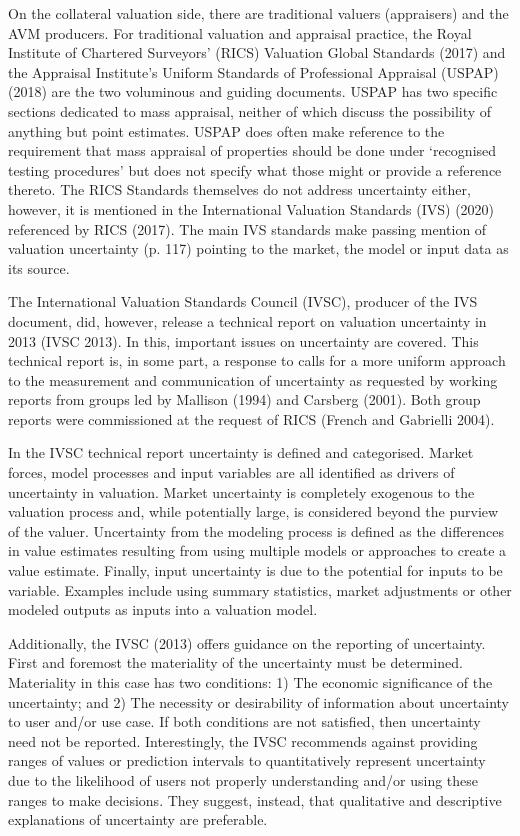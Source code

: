 \documentclass[colTwo]{anon}
\theoremstyle{definition}
\begin{document}
On the collateral valuation side, there are traditional valuers (appraisers) and the AVM producers. For traditional valuation and appraisal practice, the Royal Institute of Chartered Surveyors’ (RICS) Valuation Global Standards (2017) and the Appraisal Institute’s Uniform Standards of Professional Appraisal (USPAP) (2018) are the two voluminous and guiding documents. USPAP has two specific sections dedicated to mass appraisal, neither of which discuss the possibility of anything but point estimates. USPAP does often make reference to the requirement that mass appraisal of properties should be done under ‘recognised testing procedures’ but does not specify what those might or provide a reference thereto. The RICS Standards themselves do not address uncertainty either, however, it is mentioned in the International Valuation Standards (IVS) (2020) referenced by RICS (2017).  The main IVS standards make passing mention of valuation uncertainty (p. 117) pointing to the market, the model or input data as its source.  

The International Valuation Standards Council (IVSC), producer of the IVS document, did, however, release a technical report on valuation uncertainty in 2013 (IVSC 2013). In this, important issues on uncertainty are covered. This technical report is, in some part, a response to calls for a more uniform approach to the measurement and communication of uncertainty as requested by working reports from groups led by Mallison (1994) and Carsberg (2001).  Both group reports were commissioned at the request of RICS (French and Gabrielli 2004). 

In the IVSC technical report uncertainty is defined and categorised.  Market forces, model processes and input variables are all identified as drivers of uncertainty in valuation. Market uncertainty is completely exogenous to the valuation process and, while potentially large, is considered beyond the purview of the valuer.   Uncertainty from the modeling process is defined as the differences in value estimates resulting from using multiple models or approaches to create a value estimate.  Finally, input uncertainty is due to the potential for inputs to be variable.  Examples include using summary statistics, market adjustments or other modeled outputs as inputs into a valuation model.  

Additionally, the IVSC (2013) offers guidance on the reporting of uncertainty.  First and foremost the materiality of the uncertainty must be determined.  Materiality in this case has two conditions: 1) The economic significance of the uncertainty; and 2) The necessity or desirability of information about uncertainty to user and/or use case.  If both conditions are not satisfied, then uncertainty need not be reported.  Interestingly, the IVSC recommends against providing ranges of values or prediction intervals to quantitatively represent uncertainty due to the likelihood of users not properly understanding and/or using these ranges to make decisions.  They suggest, instead, that qualitative and descriptive explanations of uncertainty are preferable.  
\end{document}
